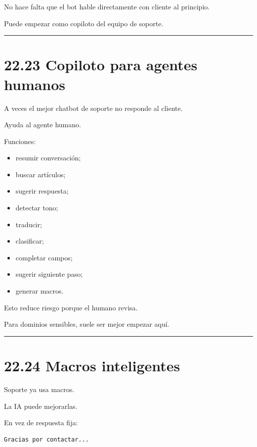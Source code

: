 No hace falta que el bot hable directamente con cliente al principio.

Puede empezar como copiloto del equipo de soporte.

\begin{center}\rule{0.5\linewidth}{0.5pt}\end{center}

\section{22.23 Copiloto para agentes
humanos}\label{copiloto-para-agentes-humanos}

A veces el mejor chatbot de soporte no responde al cliente.

Ayuda al agente humano.

Funciones:

\begin{itemize}
\tightlist
\item
  resumir conversación;
\item
  buscar artículos;
\item
  sugerir respuesta;
\item
  detectar tono;
\item
  traducir;
\item
  clasificar;
\item
  completar campos;
\item
  sugerir siguiente paso;
\item
  generar macros.
\end{itemize}

Esto reduce riesgo porque el humano revisa.

Para dominios sensibles, suele ser mejor empezar aquí.

\begin{center}\rule{0.5\linewidth}{0.5pt}\end{center}

\section{22.24 Macros inteligentes}\label{macros-inteligentes}

Soporte ya usa macros.

La IA puede mejorarlas.

En vez de respuesta fija:

\begin{lstlisting}
Gracias por contactar...
\end{lstlisting}

